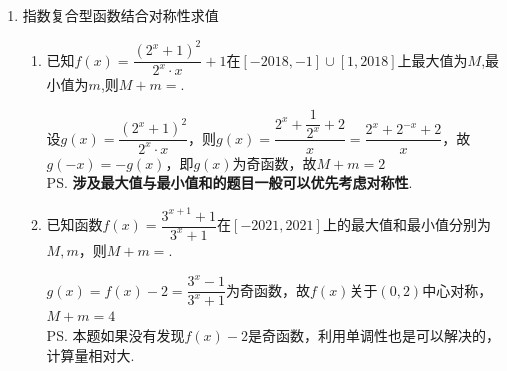 \begin{enumerate}
\begin{enumerate}
\begin{jieda}
        $x_1 \cdot x_2 = 1, x_3 + x_4 = 8$，$x_1 + x_2 + x_3 + x_4 = 8 + x_2 + \dfrac{1}{x_2}, x_2 \in (1, 2)$，故$x_1 + x_2 + x_3 + x_4 \in \left(10, \dfrac{21}{2}\right)$ \\
        \ps \textbf{对数函数翻折时，总有和常函数交点横坐标乘积为定值}.
    \end{jieda}
    \item 设 $a > b > 0$ ,函数 $y = f\left( x\right)$ 的表达式为 $f\left( x\right)  = \left| {x - \dfrac{1}{x} + \ln x}\right|$ ,若 $f\left( a\right)  = f\left( b\right)$，且关于 $x$ 的方程 $\left| {{x}^{2} + {ax} + {2ab}}\right|  + \left| {{x}^{2} - {ax} + {2ab}}\right|  = {2a}\left| x\right|$ 的整数解有且仅有 4 个,则实数 $a$ 的取值范围是\blkda{$\left[3, \dfrac{11}{3}\right)$}.
    \begin{jieda}
        注意到$f(x) = f\left(\dfrac{1}{x}\right)$，故$ab = 1, 0 < b < 1 < a$，$\left| {{x}^{2} + {ax} + {2ab}}\right|  + \left| {{x}^{2} - {ax} + {2ab}}\right|  = {2a}\left| x\right|$即$\left| {{x}^{2} + {ax} + 2}\right|  + \left| {{x}^{2} - {ax} + 2}\right|  = {2a}\left| x\right|$，根据三角不等式的取等条件可知$\left( {{x}^{2} + {ax} + 2}\right) \left( {{x}^{2} - {ax} + 2}\right) \leq 0$，即$(x^2+2)^2 \leq a^2x^2$，即$a \geq \left|x + \dfrac{2}{x}\right|$，故四个整数解为$-2,-1,1,2$，数形结合可知$a \in \left[3, \dfrac{11}{3}\right)$
    \end{jieda}
    \end{enumerate}
    \item 指数复合型函数结合对称性求值
    \begin{enumerate}
        \item 已知$f(x) = \dfrac{(2^x+1)^2}{2^x \cdot x}+1$在$[-2018, -1]\cup[1, 2018]$上最大值为$M$,最小值为$m$,则$M+m = $.
        \begin{jieda}
        设$g(x) = \dfrac{(2^x+1)^2}{2^x \cdot x}$，则$g(x) = \dfrac{2^x+\dfrac{1}{2^x}+2}{x} = \dfrac{2^x+2^{-x}+2}{x}$，故$g(-x) = -g(x)$，即$g(x)$为奇函数，故$M+m = 2$ \\
        \ps \textbf{涉及最大值与最小值和的题目一般可以优先考虑对称性}.
        \end{jieda}
        \item 已知函数$f(x) = \dfrac{3^{x+1}+1}{3^x+1}$在$[-2021, 2021]$上的最大值和最小值分别为$M, m$，则$M+m = $.
        \begin{jieda}
            $g(x) = f(x) - 2 = \dfrac{3^x - 1}{3^x+1}$为奇函数，故$f(x)$关于$(0, 2)$中心对称，$M+m = 4$ \\
            \ps 本题如果没有发现$f(x) - 2$是奇函数，利用单调性也是可以解决的，计算量相对大. \\

\end{jieda}
\end{enumerate}
\end{enumerate}
